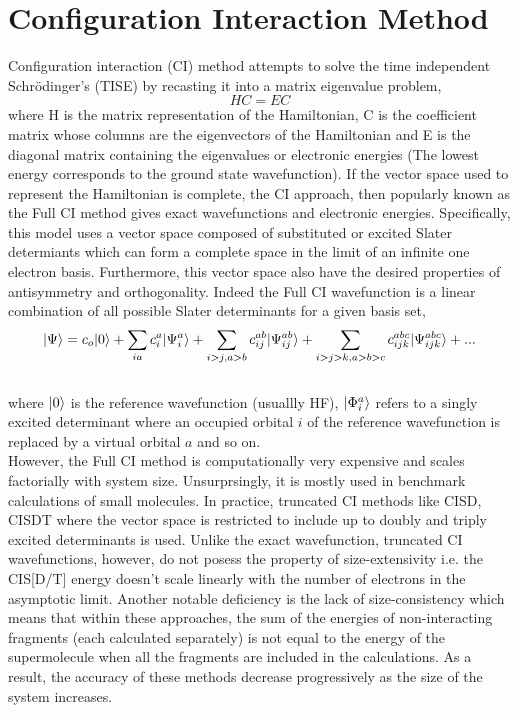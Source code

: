 \section{Configuration Interaction Method}
Configuration interaction (CI) method\cite{SherrillCI98} attempts to solve the time independent 
Schr\"odinger's (TISE) by recasting it into a matrix eigenvalue problem, 
\begin{equation}
HC = EC
\end{equation}
where H is the matrix representation of the Hamiltonian, C is the coefficient matrix
whose columns are the eigenvectors of the Hamiltonian and E is the diagonal matrix 
containing the eigenvalues or electronic energies (The lowest energy corresponds to 
the ground state wavefunction). If the vector space used to represent the Hamiltonian 
is complete, the CI approach, then popularly known as the Full CI method gives exact 
wavefunctions and electronic energies. Specifically, this model uses a vector space 
composed of substituted or excited Slater determiants which can form a complete
space in the limit of an infinite one electron basis. Furthermore, this vector space 
also have the desired properties of antisymmetry and orthogonality. Indeed the Full 
CI wavefunction is a linear combination of all possible Slater determinants for a given basis set,
\\
\begin{equation}
| \Psi \rangle = c_o| 0 \rangle + \sum_{ia}{c}_{i}^{a}| {\Psi}^a_i \rangle + \sum_{i>j,a>b}c_{ij}^{ab}| \Psi^{ab}_{ij} \rangle + \sum_{i>j>k,a>b>c}c_{ijk}^{abc}| \Psi^{abc}_{ijk} \rangle + ...
\end{equation}
\\
where $| 0 \rangle$ is the reference wavefunction (usuallly HF), $| {\Phi}^a_i \rangle$ refers to a singly excited determinant where an occupied orbital $i$ of the reference wavefunction is replaced by a virtual orbital $a$
and so on.\\
However, the Full CI method is computationally very expensive and scales factorially with 
system size. Unsurprsingly, it is mostly used in benchmark calculations of small molecules.
In practice, truncated CI methods like CISD, CISDT where the vector 
space is restricted to include up to doubly and triply excited determinants 
is used. Unlike the exact wavefunction, truncated CI wavefunctions, however, 
do not posess the property of size-extensivity i.e. the CIS[D/T] energy doesn't scale 
linearly with the number of electrons in the asymptotic limit. Another notable deficiency 
is the lack of size-consistency which means that within these approaches, the sum of the 
energies of non-interacting fragments (each calculated separately) is not equal to the energy 
of the supermolecule when all the fragments are included in the calculations.
As a result, the accuracy of these methods decrease progressively as the size of the system increases.

